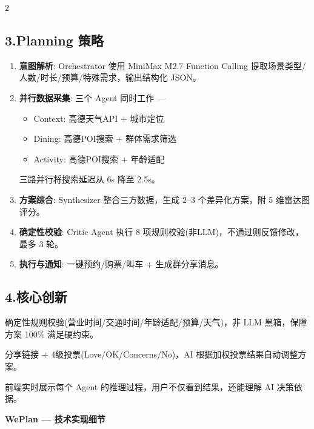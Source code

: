 \documentclass[10pt,a4paper]{ctexart}
\begin{document}
\begin{multicols}{2}
\subsection*{\color{accent}3.\;Planning 策略}
\begin{enumerate}
\item \textbf{意图解析}: Orchestrator 使用 MiniMax M2.7 Function Calling 提取场景类型/人数/时长/预算/特殊需求，输出结构化 JSON。
\item \textbf{并行数据采集}: 三个 Agent 同时工作 ---
  \begin{itemize}
  \item Context: 高德天气API + 城市定位
  \item Dining: 高德POI搜索 + 群体需求筛选
  \item Activity: 高德POI搜索 + 年龄适配
  \end{itemize}
  三路并行将搜索延迟从 6s 降至 2.5s。
\item \textbf{方案综合}: Synthesizer 整合三方数据，生成 2--3 个差异化方案，附 5 维雷达图评分。
\item \textbf{确定性校验}: Critic Agent 执行 8 项规则校验(非LLM)，不通过则反馈修改，最多 3 轮。
\item \textbf{执行与通知}: 一键预约/购票/叫车 + 生成群分享消息。
\end{enumerate}

\subsection*{\color{accent}4.\;核心创新}
\begin{tcolorbox}[title=Critic 反馈循环]
确定性规则校验(营业时间/交通时间/年龄适配/预算/天气)，非 LLM 黑箱，保障方案 100\% 满足硬约束。
\end{tcolorbox}

\begin{tcolorbox}[title=群体共识投票]
分享链接 + 4级投票(Love/OK/Concerns/No)，AI 根据加权投票结果自动调整方案。
\end{tcolorbox}

\begin{tcolorbox}[title=Agent Thinking 可视化]
前端实时展示每个 Agent 的推理过程，用户不仅看到结果，还能理解 AI 决策依据。
\end{tcolorbox}

\end{multicols}

\newpage

\begin{center}
{\Large\bfseries\color{primary} WePlan --- 技术实现细节}
\end{center}
\vspace{-4pt}
\noindent{\color{primary}\rule{\linewidth}{1pt}}
\vspace{2pt}
\end{document}
